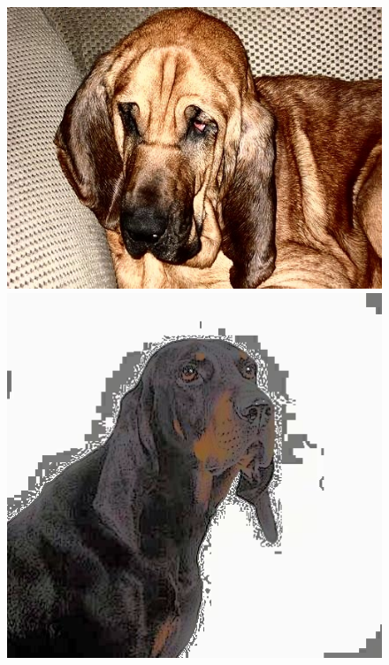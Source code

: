 \begin{appendices}
\begin{figure}[htb]
\begin{minipage}{0.19\textwidth}
\end{minipage}
\begin{minipage}{0.19\textwidth}
\includegraphics[width=\textwidth]{images/anomalien/HA/n02088466_9691.jpg}
\end{minipage}
\begin{minipage}{0.19\textwidth}
\includegraphics[width=\textwidth]{images/anomalien/HA/n02089078_4544.jpg}
\end{minipage}
\begin{minipage}{0.19\textwidth}

\end{minipage}
\end{figure}
\end{appendices}
